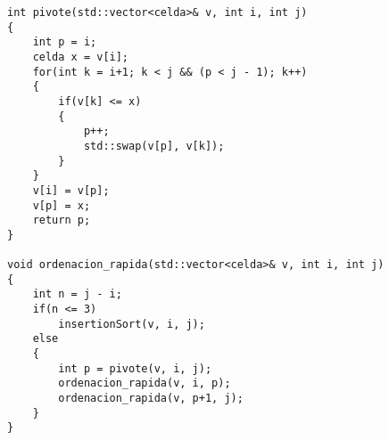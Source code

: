\begin{lstlisting}
int pivote(std::vector<celda>& v, int i, int j)
{
    int p = i;
    celda x = v[i];
    for(int k = i+1; k < j && (p < j - 1); k++)
    {
        if(v[k] <= x)
        {
            p++;
            std::swap(v[p], v[k]);
        }
    }
    v[i] = v[p];
    v[p] = x;
    return p;
}

void ordenacion_rapida(std::vector<celda>& v, int i, int j)
{
    int n = j - i;
    if(n <= 3)
        insertionSort(v, i, j);
    else
    {
        int p = pivote(v, i, j);
        ordenacion_rapida(v, i, p);
        ordenacion_rapida(v, p+1, j);
    }
}
\end{lstlisting}